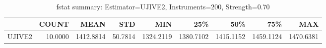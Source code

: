 \begin{table}[ht]
\centering
\caption{fstat summary: Estimator=UJIVE2, Instruments=200, Strength=0.70}
\begin{tabular}{lrrrrrrrr}
\toprule
 & COUNT & MEAN & STD & MIN & 25\% & 50\% & 75\% & MAX \\
\midrule
UJIVE2 & 10.0000 & 1412.8814 & 50.7814 & 1324.2119 & 1380.7102 & 1415.1152 & 1459.1124 & 1470.6381 \\
\bottomrule
\end{tabular}
\end{table}
